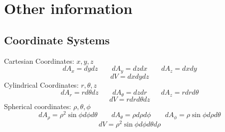 \documentclass{article}
\begin{document}
    \setcounter{secnumdepth}{0}
    \section{Other information}
    \subsection{Coordinate Systems}
    \begin{outline}
        \1 Cartesian Coordinates: \(x,y,z\)\[dA_x=dydz\qquad dA_y=dzdx \qquad dA_z=dxdy\]\[dV=dxdydz\]
        \1 Cylindrical Coordinates: \(r,\theta,z\)\[dA_r=rd\theta dz\qquad dA_\theta=dzdr\qquad dA_z=rdrd\theta\]\[dV=rdrd\theta dz\]
        \1 Spherical coordinates: \(\rho,\theta,\phi\)\[dA_\rho=\rho^2\sin\phi d\phi d\theta\qquad dA_\theta=\rho d\rho d\phi\qquad dA_\phi=\rho\sin\phi d\rho d\theta\]\[dV=\rho^2\sin\phi d\phi d\theta d\rho \]

    \end{outline}
\end{document}
